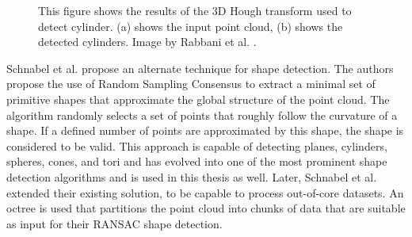 \begin{figure}
\centering
{}
\caption[Results of 3d Hough transform used to detect cylinder]
{This figure shows the results of the 3D Hough transform used to detect cylinder. (a) shows the input point cloud, (b) shows the detected cylinders. Image by Rabbani et al. \cite{rabbani2005efficient}.}
\label{fig:hough_cylinder}
\end{figure}


Schnabel et al. \cite{schnabel-2007-efficient} propose an alternate technique for shape detection. The authors propose the use of Random Sampling Consensus \cite{fischler1981random} to extract a minimal set of primitive shapes that approximate the global structure of the point cloud. The algorithm randomly selects a set of points that roughly follow the curvature of a shape. If a defined number of points are approximated by this shape, the shape is considered to be valid. This approach is capable of detecting planes, cylinders, spheres, cones, and tori and has evolved into one of the most prominent shape detection algorithms and is used in this thesis as well. Later, Schnabel et al. \cite{schnabel-2007-ransac} extended their existing solution, to be capable to process out-of-core datasets. An octree is used that partitions the point cloud into chunks of data that are suitable as input for their RANSAC shape detection. 

